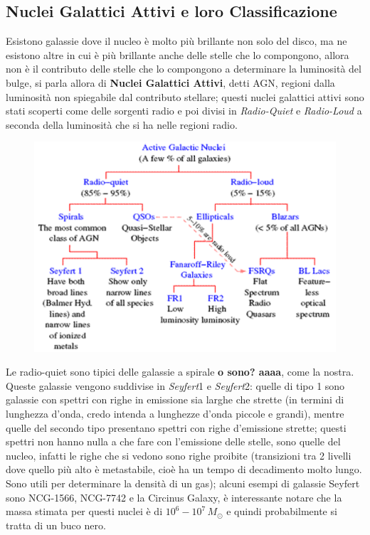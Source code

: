 \subsection{Nuclei Galattici Attivi e loro Classificazione}

Esistono galassie dove il nucleo è molto più brillante non solo del disco, ma ne esistono altre in cui è più brillante anche delle stelle che lo compongono, allora non è il contributo delle stelle che lo compongono a determinare la luminosità del bulge, si parla allora di \textbf{Nuclei Galattici Attivi}, detti AGN, regioni dalla luminosità non spiegabile dal contributo stellare; questi nuclei galattici attivi sono stati scoperti come delle sorgenti radio e poi divisi in \textit{Radio-Quiet} e \textit{Radio-Loud} a seconda della luminosità che si ha nelle regioni radio.

\begin{figure}[H]
    \centering
    \includegraphics[width=\textwidth]{immagini_lezioni12-12/35.png}
\end{figure}

Le radio-quiet sono tipici delle galassie a spirale \textbf{o sono? aaaa}, come la nostra. Queste galassie vengono suddivise in \textit{Seyfert}1 e \textit{Seyfert}2: quelle di tipo 1 sono galassie con spettri con righe in emissione sia larghe che strette (in termini di lunghezza d'onda, credo intenda a lunghezze d'onda piccole e grandi), mentre quelle del secondo tipo presentano spettri con righe d'emissione strette; questi spettri non hanno nulla a che fare con l'emissione delle stelle, sono quelle del nucleo, infatti le righe che si vedono sono righe proibite (transizioni tra 2 livelli dove quello più alto è metastabile, cioè ha un tempo di decadimento molto lungo. Sono utili per determinare la densità di un gas); alcuni esempi di galassie Seyfert sono NCG-1566, NCG-7742 e la Circinus Galaxy, è interessante notare che la massa stimata per questi nuclei è di $10^6-10^7\,M_{\odot}$ e quindi probabilmente si tratta di un buco nero.

